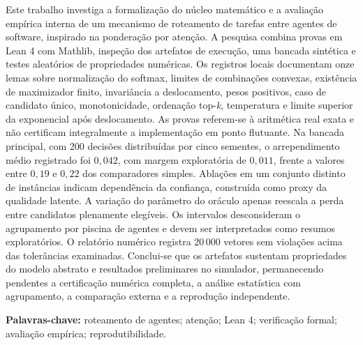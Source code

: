 \documentclass[12pt,openany,oneside,a4paper,brazil,chapter=TITLE]{abntex2}
\begin{document}
\begin{resumo}
Este trabalho investiga a formalização do núcleo matemático e a avaliação empírica interna de um mecanismo de roteamento de tarefas entre agentes de software, inspirado na ponderação por atenção. A pesquisa combina provas em Lean 4 com Mathlib, inspeção dos artefatos de execução, uma bancada sintética e testes aleatórios de propriedades numéricas. Os registros locais documentam onze lemas sobre normalização do softmax, limites de combinações convexas, existência de maximizador finito, invariância a deslocamento, pesos positivos, caso de candidato único, monotonicidade, ordenação top-\textit{k}, temperatura e limite superior da exponencial após deslocamento. As provas referem-se à aritmética real exata e não certificam integralmente a implementação em ponto flutuante. Na bancada principal, com 200 decisões distribuídas por cinco sementes, o arrependimento médio registrado foi $0{,}042$, com margem exploratória de $0{,}011$, frente a valores entre $0{,}19$ e $0{,}22$ dos comparadores simples. Ablações em um conjunto distinto de instâncias indicam dependência da confiança, construída como proxy da qualidade latente. A variação do parâmetro do oráculo apenas reescala a perda entre candidatos plenamente elegíveis. Os intervalos desconsideram o agrupamento por piscina de agentes e devem ser interpretados como resumos exploratórios. O relatório numérico registra 20\,000 vetores sem violações acima das tolerâncias examinadas. Conclui-se que os artefatos sustentam propriedades do modelo abstrato e resultados preliminares no simulador, permanecendo pendentes a certificação numérica completa, a análise estatística com agrupamento, a comparação externa e a reprodução independente.
\par\vspace{\baselineskip}
\noindent\textbf{Palavras-chave:} roteamento de agentes; atenção; Lean 4; verificação formal; avaliação empírica; reprodutibilidade.
\end{resumo}
\end{document}
